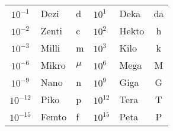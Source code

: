 \begin{tabular}{cll|llc}
  $10^{-1}$  & Dezi  & d     &  $10^{1}$ & Deka  & da \\
  $10^{-2}$  & Zenti & c     &  $10^{2}$ & Hekto & h  \\
  $10^{-3}$  & Milli & m     &  $10^{3}$ & Kilo  & k  \\
  $10^{-6}$  & Mikro & $\mu$ &  $10^{6}$ & Mega  & M  \\
  $10^{-9}$  & Nano  & n     &  $10^{9}$ & Giga  & G  \\
  $10^{-12}$ & Piko  & p     & $10^{12}$ & Tera  & T  \\
  $10^{-15}$ & Femto & f     & $10^{15}$ & Peta  & P  \\
\end{tabular}

